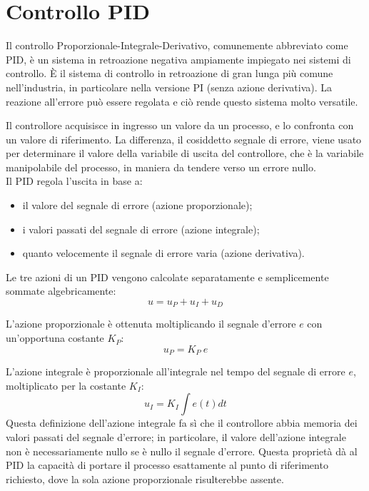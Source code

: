\documentclass[laurea,oneside,11pt]{USiena_tesiLM}
\begin{document}
\section{Controllo PID}
Il controllo Proporzionale-Integrale-Derivativo, comunemente abbreviato come PID, è un sistema in retroazione negativa ampiamente impiegato nei sistemi di controllo. È il sistema di controllo in retroazione di gran lunga più comune nell'industria, in particolare nella versione PI (senza azione derivativa). 
La reazione all'errore può essere regolata e ciò rende questo sistema molto versatile.

Il controllore acquisisce in ingresso un valore da un processo, e lo confronta con un valore di riferimento. La differenza, il cosiddetto segnale di errore, viene  usato per determinare il valore della variabile di uscita del controllore, che è la variabile manipolabile del processo, in maniera da tendere verso un errore nullo.\\

Il PID regola l'uscita in base a:
\begin{itemize}
\item il valore del segnale di errore (azione proporzionale);
\item i valori passati del segnale di errore (azione integrale);
\item quanto velocemente il segnale di errore varia (azione derivativa).
\end{itemize}

Le tre azioni di un PID vengono calcolate separatamente e semplicemente sommate algebricamente:
\begin{equation}
u=u_P + u_I + u_D 
\end{equation}

L'azione proporzionale è ottenuta moltiplicando il segnale d'errore $e$ con un'opportuna costante $K_P$:
\begin{equation}
u_P = K_P \ e
\end{equation}

L'azione integrale è proporzionale all'integrale nel tempo del segnale di errore $e$, moltiplicato per la costante $K_I$:
\begin{equation}
u_I = K_I \int e(t) dt
\end{equation}
Questa definizione dell'azione integrale fa sì che il controllore abbia memoria dei valori passati del segnale d'errore; in particolare, il valore dell'azione integrale non è necessariamente nullo se è nullo il segnale d'errore. Questa proprietà dà al PID la capacità di portare il processo esattamente al punto di riferimento richiesto, dove la sola azione proporzionale risulterebbe assente.
\end{document}

